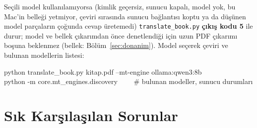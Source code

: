 \documentclass[11pt,a4paper]{article}
\newcommand{\dosya}[1]{\texttt{#1}}
\begin{document}
Seçili model kullanılamıyorsa (kimlik geçersiz, sunucu kapalı, model yok,
bu Mac'in belleği yetmiyor, çeviri sırasında sunucu bağlantısı koptu ya da
düşünen model parçaların çoğunda cevap üretemedi) \dosya{translate\_book.py}
\textbf{çıkış kodu 5} ile durur; model ve bellek çıkarımdan önce denetlendiği
için uzun PDF çıkarımı boşuna beklenmez (bellek: Bölüm~\ref{sec:donanim}).
Model seçerek çeviri ve bulunan modellerin listesi:

\begin{komut}
python translate\_book.py kitap.pdf --mt-engine ollama:qwen3:8b\\
python -m core.mt\_engines.discovery \ \ \ \ \# bulunan modeller, sunucu durumları
\end{komut}

\section{Sık Karşılaşılan Sorunlar}
\end{document}
